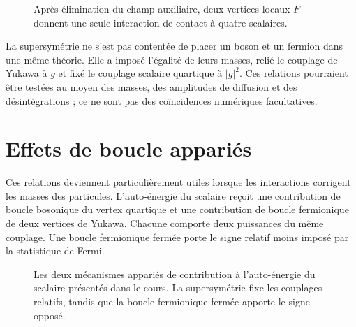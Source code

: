 \begin{figure}[H]
\centering
{}
\caption{Après élimination du champ auxiliaire, deux vertices locaux \(F\) donnent une seule interaction de contact à quatre scalaires.}
\end{figure}

La supersymétrie ne s’est pas contentée de placer un boson et un fermion dans une même théorie. Elle a imposé l’égalité de leurs masses, relié le couplage de Yukawa à \(g\) et fixé le couplage scalaire quartique à \(|g|^2\). Ces relations pourraient être testées au moyen des masses, des amplitudes de diffusion et des désintégrations ; ce ne sont pas des coïncidences numériques facultatives.

\section{Effets de boucle appariés}

Ces relations deviennent particulièrement utiles lorsque les interactions corrigent les masses des particules. L’auto-énergie du scalaire reçoit une contribution de boucle bosonique du vertex quartique et une contribution de boucle fermionique de deux vertices de Yukawa. Chacune comporte deux puissances du même couplage. Une boucle fermionique fermée porte le signe relatif moins imposé par la statistique de Fermi.

\begin{figure}[H]
\centering
{}
\caption{Les deux mécanismes appariés de contribution à l’auto-énergie du scalaire présentés dans le cours. La supersymétrie fixe les couplages relatifs, tandis que la boucle fermionique fermée apporte le signe opposé.}
\end{figure}

